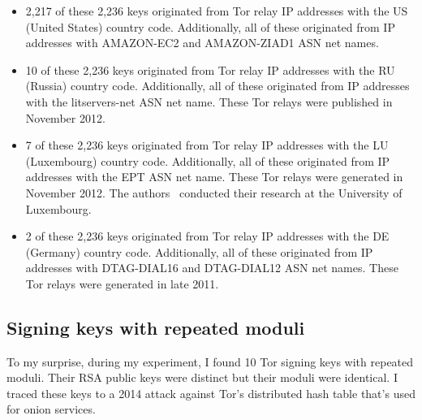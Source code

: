 \begin{itemize}
    \item 2,217 of these 2,236 keys originated from Tor relay IP addresses with the US (United States) country code. Additionally, all of these originated from IP addresses with AMAZON-EC2 and AMAZON-ZIAD1 ASN net names.
    \item 10 of these 2,236 keys originated from Tor relay IP addresses with the RU (Russia) country code. Additionally, all of these originated from IP addresses with the litservers-net ASN net name. These Tor relays were published in November 2012.
    \item 7 of these 2,236 keys originated from Tor relay IP addresses with the LU (Luxembourg) country code. Additionally, all of these originated from IP addresses with the EPT ASN net name. These Tor relays were generated in November 2012. The authors~\cite{biryukov2013trawling} conducted their research at the University of Luxembourg.
    \item 2 of these 2,236 keys originated from Tor relay IP addresses with the DE (Germany) country code. Additionally, all of these originated from IP addresses with DTAG-DIAL16 and DTAG-DIAL12 ASN net names. These Tor relays were generated in late 2011.
\end{itemize}


\subsection{Signing keys with repeated moduli}
To my surprise, during my experiment, I found 10 Tor signing keys with repeated moduli. Their RSA public keys were distinct but their moduli were identical. I traced these keys to a 2014 attack against Tor's distributed hash table that's used for onion services.